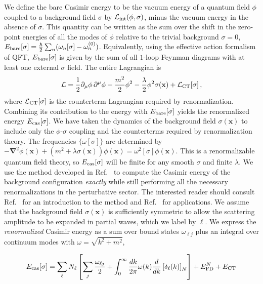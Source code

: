 \documentclass[a4paper,aps,amsfonts,prl,showpacs,nobibnotes,nofootinbib,%
tightenlines,twocolumn]{revtex4}
\newcommand{\vek}[1]{\mathbf{#1}}
\begin{document}
We define the bare Casimir energy to be the vacuum energy of a quantum
field $\phi$ coupled to a background field $\sigma$ by ${\cal L}_{\rm
int}(\phi,\sigma)$, minus the vacuum energy in the absence of
$\sigma$.  This quantity can be written as the sum over the
shift in the zero-point energies of all the modes of
$\phi$ relative to the trivial background
$\sigma=0$, $ E_{\rm bare}[\sigma]=\frac{\hbar}{2}\sum_n (\omega_n[\sigma]
- \omega_n^{(0)})$. Equivalently, using the effective action formalism of
QFT, $E_{\rm bare}[\sigma]$ is given by the sum of all $1$-loop
Feynman diagrams with at least one external $\sigma$ field.  The
entire Lagrangian is
%
\begin{equation}
    \mathcal{L} = \frac{1}{2} \partial_\mu\phi\,\partial^\mu\phi -
    \frac{m^2}{2} \phi^2 - \frac{\lambda}{2} \phi^2 \sigma(\vek{x}) +
    \mathcal{L}_{\rm CT}[\sigma]\,,
    \label{2.2}
\end{equation}
%
where ${\cal L}_{\rm CT}[\sigma]$ is the counterterm Lagrangian
required by renormalization.  Combining its contribution to the energy
with $E_{\rm bare}[\sigma]$ yields the renormalized energy $E_{\rm
cas}[\sigma]$.  We have taken the dynamics of the background field
$\sigma(\vek{x})$ to include only the $\phi$-$\sigma$ coupling and the
counterterms required by renormalization theory.  The frequencies
$\{\omega[\sigma]\}$ are determined by
$-\mathbf{\nabla}^{2}\phi(\vek{x}) + (m^2 +
\lambda\sigma(\vek{x}))\phi(\vek{x}) =
\omega^{2}[\sigma]\phi(\vek{x}).$ This is a renormalizable quantum
field theory, so $E_{\rm cas}[\sigma]$ will be finite for any smooth
$\sigma$ and finite $\lambda$.  We use the method developed in
Ref.~\cite{dens} to compute the Casimir energy of the background
configuration \emph{exactly} while still performing all the necessary
renormalizations in the perturbative sector.  The interested reader
should consult Ref.~\cite{GJW} for an introduction to the method and
Ref.~\cite{us} for applications.  We assume that the background field
$\sigma(\vek x)$ is sufficiently symmetric to allow the scattering
amplitude to be expanded in partial waves, which we label by $\ell$. 
We express the \emph{renormalized} Casimir energy as a sum over bound
states $\omega_{\ell j}$ plus an integral over continuum modes with $\omega =
\sqrt{k^2+ m^2}$,
%
\begin{widetext}\vspace*{-\bigskipamount}
\begin{equation}
E_{\rm cas}[\sigma]=\sum_\ell N_\ell\left[\sum_j
\frac{\omega_{\ell j}}{2} + \int_0^\infty \frac{dk}{2\pi}
\omega(k)\frac{d}{dk}\left[\delta_\ell(k)\right]_{N}\right]
+ E_{\rm FD}^{N} + E_{\rm CT}
\label{evac1}
\end{equation}
\end{widetext}
\end{document}
